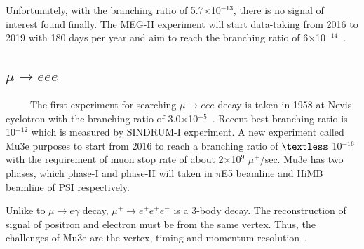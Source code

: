 Unfortunately, with the branching ratio of 5.7$\times$10$^{-13}$, there is no signal of interest found finally.
The MEG-II experiment will start data-taking from 2016 to 2019 with 180 days per year and aim to reach the branching ratio of 6$\times$10$^{-14}$~\cite{megtdr}.

\subsection{$\mu \rightarrow eee$}
~~~~~The first experiment for searching $\mu \rightarrow eee$ decay is taken in 1958 at Nevis cyclotron with the branching ratio of 3.0$\times$10$^{-5}$~\cite{lyn}.
Recent best branching ratio is 10$^{-12}$ which is measured by SINDRUM-I experiment.
A new experiment called Mu3e purposes to start from 2016 to reach a branching ratio of $\textless$ 10$^{-16}$ with the requirement of muon stop rate of about 2$\times$10$^9$ $\mu^+$/sec.
Mu3e has two phases, which phase-I and phase-II will taken in $\pi$E5 beamline and HiMB beamline of PSI respectively.

Unlike to $\mu \rightarrow e\gamma$ decay, $\mu^+ \rightarrow e^+e^+e^-$ is a 3-body decay.
The reconstruction of signal of positron and electron must be from the same vertex.
Thus, the challenges of Mu3e are the vertex, timing and momentum resolution~\cite{mu3e}.

